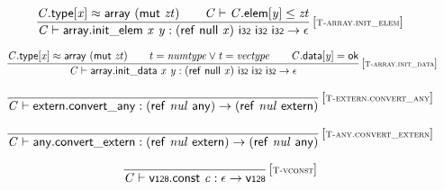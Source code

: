 $$
\begin{array}{@{}c@{}}\displaystyle
\frac{
{\mathit{C}}.\mathsf{type}{}[{\mathit{x}}] \approx \mathsf{array}~(\mathsf{mut}~{\mathit{zt}})
 \qquad
{\mathit{C}} \vdash {\mathit{C}}.\mathsf{elem}{}[{\mathit{y}}] \leq {\mathit{zt}}
}{
{\mathit{C}} \vdash \mathsf{array.init\_elem}~{\mathit{x}}~{\mathit{y}} : (\mathsf{ref}~\mathsf{null}~{\mathit{x}})~\mathsf{i{\scriptstyle32}}~\mathsf{i{\scriptstyle32}}~\mathsf{i{\scriptstyle32}} \rightarrow \epsilon
} \, {[\textsc{\scriptsize T{-}array.init\_elem}]}
\qquad
\end{array}
$$

$$
\begin{array}{@{}c@{}}\displaystyle
\frac{
{\mathit{C}}.\mathsf{type}{}[{\mathit{x}}] \approx \mathsf{array}~(\mathsf{mut}~{\mathit{zt}})
 \qquad
{\mathit{t}} = {\mathit{numtype}} \lor {\mathit{t}} = {\mathit{vectype}}
 \qquad
{\mathit{C}}.\mathsf{data}{}[{\mathit{y}}] = \mathsf{ok}
}{
{\mathit{C}} \vdash \mathsf{array.init\_data}~{\mathit{x}}~{\mathit{y}} : (\mathsf{ref}~\mathsf{null}~{\mathit{x}})~\mathsf{i{\scriptstyle32}}~\mathsf{i{\scriptstyle32}}~\mathsf{i{\scriptstyle32}} \rightarrow \epsilon
} \, {[\textsc{\scriptsize T{-}array.init\_data}]}
\qquad
\end{array}
$$

\vspace{1ex}

$$
\begin{array}{@{}c@{}}\displaystyle
\frac{
}{
{\mathit{C}} \vdash \mathsf{extern.convert\_any} : (\mathsf{ref}~{\mathit{nul}}~\mathsf{any}) \rightarrow (\mathsf{ref}~{\mathit{nul}}~\mathsf{extern})
} \, {[\textsc{\scriptsize T{-}extern.convert\_any}]}
\qquad
\end{array}
$$

$$
\begin{array}{@{}c@{}}\displaystyle
\frac{
}{
{\mathit{C}} \vdash \mathsf{any.convert\_extern} : (\mathsf{ref}~{\mathit{nul}}~\mathsf{extern}) \rightarrow (\mathsf{ref}~{\mathit{nul}}~\mathsf{any})
} \, {[\textsc{\scriptsize T{-}any.convert\_extern}]}
\qquad
\end{array}
$$

\vspace{1ex}

$$
\begin{array}{@{}c@{}}\displaystyle
\frac{
}{
{\mathit{C}} \vdash \mathsf{v{\scriptstyle128}}.\mathsf{const}~{\mathit{c}} : \epsilon \rightarrow \mathsf{v{\scriptstyle128}}
} \, {[\textsc{\scriptsize T{-}vconst}]}
\qquad
\end{array}
$$

